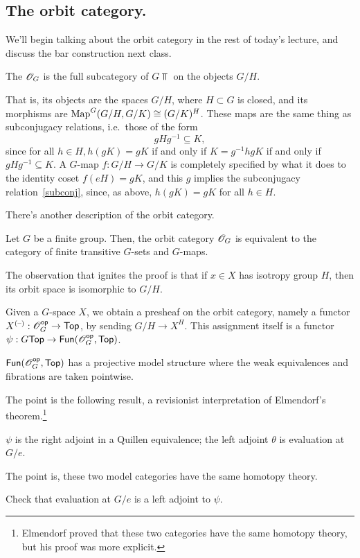 \subsection*{The orbit category.}
We'll begin talking about the orbit category in the rest of today's lecture, and discuss the bar construction next
class.
\begin{defn}
The  $\mathscr O_G$ is the full subcategory of $G\Top$ on the objects $G/H$.
\end{defn}
That is, its objects are the spaces $G/H$, where $H\subset G$ is closed, and its morphisms are $\operatorname{Map}^G(G/H,
G/K)\cong (G/K)^H$. These maps are the same thing as subconjugacy relations, i.e.\ those of the form
\begin{equation}
\label{subconj}
gHg^{-1}\subseteq K,
\end{equation}
since for all $h \in H, h(gK) = gK$ if and only if $K = g^{-1}hgK$ if and only if $gHg^{-1} \subseteq K$.
A $G$-map $f:G/H\to G/K$ is completely specified by what it does to the identity coset $f(eH) = gK$, and this $g$
implies the subconjugacy relation~\eqref{subconj}, since, as above, $h(gK) = gK$ for all $h \in H$.

There's another description of the orbit category.
\begin{prop}
Let $G$ be a finite group. Then, the orbit category $\mathscr O_G$ is equivalent to the category of finite transitive
$G$-sets and $G$-maps.
\end{prop}
The observation that ignites the proof is that if $x\in X$ has isotropy group $H$, then its orbit space is
isomorphic to $G/H$.
\begin{defn}
Given a $G$-space $X$, we obtain a presheaf on the orbit category, namely a functor $X^{(\text{--})}:\mathscr O_G^{\mathsf{op}}\to\mathsf{Top}$, by
sending $G/H\to X^H$. This assignment itself is a functor $\psi:G\mathsf{Top}\to\mathsf{Fun}(\mathscr O_G^{\mathsf{op}}, \mathsf{Top})$.
\end{defn}
\begin{prop}
$\mathsf{Fun}(\mathscr O_G^{\mathsf{op}}, \mathsf{Top})$ has a projective model structure where the weak equivalences and fibrations are taken
pointwise.
\end{prop}
The point is the following result, a revisionist interpretation of Elmendorf's theorem.\footnote{Elmendorf proved
that these two categories have the same homotopy theory, but his proof was more explicit.}
\begin{thm}
\label{revElmen}
$\psi$ is the right adjoint in a Quillen equivalence; the left adjoint $\theta$ is evaluation at $G/e$.
\end{thm}
The point is, these two model categories have the same homotopy theory.
\begin{ex}
Check that evaluation at $G/e$ is a left adjoint to $\psi$.
\end{ex}
